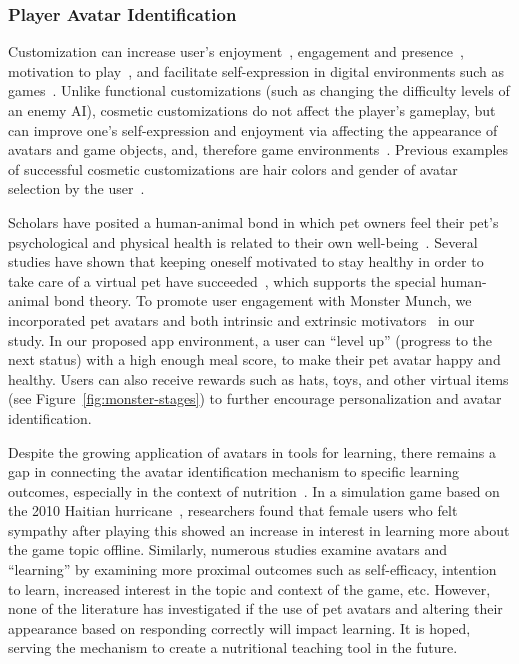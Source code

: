 \vspace{-5pt}
\subsubsection{Player Avatar Identification}
Customization can increase user's enjoyment~\cite{birk2016fostering,marathe2011drives,trepte2010avatar,turkay2015effects}, engagement and presence~\cite{ng2013examining}, motivation to play~\cite{turkay2015effects}, and facilitate self-expression in digital environments such as games~\cite{adinolf2011controlling,bailey2009avatar}. Unlike functional customizations (such as changing the difficulty levels of an enemy AI), cosmetic customizations do not affect the player's gameplay, but can improve one's self-expression and enjoyment via affecting the appearance of avatars and game objects, and, therefore game environments~\cite{cuthbert2019effects}. Previous examples of successful cosmetic customizations are hair colors and gender of avatar selection by the user~\cite{turkay2014effects}. 

Scholars have posited a human-animal bond in which pet owners feel their pet's psychological and physical health is related to their own well-being~\cite{chesney2007illusion,cohen2001defining,hosey2014human,lin2017exploring,zichermann2011gamification}. Several studies have shown that keeping oneself motivated to stay healthy in order to take care of a virtual pet have succeeded~\cite{ahn2015using,byrne2012caring,lin2006fish,pollak2010s}, which supports the special human-animal bond theory. To promote user engagement with Monster Munch, we incorporated pet avatars and both intrinsic and extrinsic motivators~\cite{chen2016scaffolding,habgood2011motivating} in our study. In our proposed app environment, a user can ``level up'' (progress to the next status) with a high enough meal score, to make their pet avatar happy and healthy. Users can also receive rewards such as hats, toys, and other virtual items (see Figure~\ref{fig:monster-stages}) to further encourage personalization and avatar identification.


Despite the growing application of avatars in tools for learning, there remains a gap in connecting the avatar identification mechanism to specific learning outcomes, especially in the context of nutrition~\cite{chang2019stereotype,chen2019effects,de2019algebright,lin2019evaluating}. In a simulation game based on the 2010 Haitian hurricane~\cite{bachen2016presence}, researchers found that female users who felt sympathy after playing this showed an increase in interest in learning more about the game topic offline. Similarly, numerous studies examine avatars and ``learning'' by examining more proximal outcomes such as self-efficacy, intention to learn, increased interest in the topic and context of the game, etc. However, none of the literature has investigated if the use of pet avatars and altering their appearance based on responding correctly will impact learning. It is hoped, serving the mechanism to create a nutritional teaching tool in the future. 



